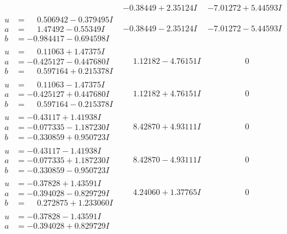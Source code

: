 \documentclass[1p]{elsarticle_modified}
\theoremstyle{definition}
\begin{document}
$$\begin{array}{c|c|c}
 & -0.38449 + 2.35124 I & -7.01272 + 5.44593 I \\ \hline\begin{aligned}
u &= \phantom{-}0.506942 - 0.379495 I \\
a &= \phantom{-}1.47492 - 0.55349 I \\
b &= -0.984417 - 0.694598 I\end{aligned}
 & -0.38449 - 2.35124 I & -7.01272 - 5.44593 I \\ \hline\begin{aligned}
u &= \phantom{-}0.11063 + 1.47375 I \\
a &= -0.425127 - 0.447680 I \\
b &= \phantom{-}0.597164 + 0.215378 I\end{aligned}
 & \phantom{-}1.12182 - 4.76151 I & \phantom{-0.000000 } 0 \\ \hline\begin{aligned}
u &= \phantom{-}0.11063 - 1.47375 I \\
a &= -0.425127 + 0.447680 I \\
b &= \phantom{-}0.597164 - 0.215378 I\end{aligned}
 & \phantom{-}1.12182 + 4.76151 I & \phantom{-0.000000 } 0 \\ \hline\begin{aligned}
u &= -0.43117 + 1.41938 I \\
a &= -0.077335 - 1.187230 I \\
b &= -0.330859 + 0.950723 I\end{aligned}
 & \phantom{-}8.42870 + 4.93111 I & \phantom{-0.000000 } 0 \\ \hline\begin{aligned}
u &= -0.43117 - 1.41938 I \\
a &= -0.077335 + 1.187230 I \\
b &= -0.330859 - 0.950723 I\end{aligned}
 & \phantom{-}8.42870 - 4.93111 I & \phantom{-0.000000 } 0 \\ \hline\begin{aligned}
u &= -0.37828 + 1.43591 I \\
a &= -0.394028 - 0.829729 I \\
b &= \phantom{-}0.272875 + 1.233060 I\end{aligned}
 & \phantom{-}4.24060 + 1.37765 I & \phantom{-0.000000 } 0 \\ \hline\begin{aligned}
u &= -0.37828 - 1.43591 I \\
a &= -0.394028 + 0.829729 I \\

\end{aligned}
\end{array}$$
\end{document}
